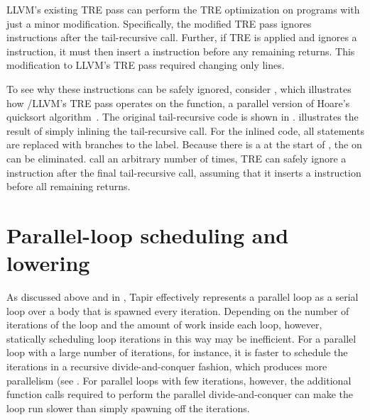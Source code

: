 LLVM's existing TRE pass can perform the TRE optimization on \tapir
programs with just a minor modification.  Specifically, the modified
TRE pass ignores \sync instructions after the tail-recursive call.
Further, if TRE is applied and ignores a \sync instruction, it must
then insert a \sync instruction before any remaining returns.  This
modification to LLVM's TRE pass required changing only
 lines.

To see why these \sync instructions can be safely ignored, consider
, which illustrates how \tapir/LLVM's TRE pass operates
on the  function, a parallel version of Hoare's quicksort
algorithm~\cite{Hoare61}.  The original tail-recursive code is shown
in .   illustrates the
result of simply inlining the tail-recursive call.  For the inlined
code, all  statements are replaced with branches to the
 label.  Because there is a \CilkSync at the start of
, the \CilkSync on  can be eliminated.
call an arbitrary number of times, TRE can safely ignore a \CilkSync
instruction after the final tail-recursive call, assuming that it
inserts a \CilkSync instruction before all remaining returns.

\section{Parallel-loop scheduling and lowering}

As discussed above and in , Tapir effectively represents
a parallel loop as a serial loop over a body that is spawned every
iteration.  Depending on the number of iterations of the loop and the
amount of work inside each loop, however, statically scheduling loop
iterations in this way may be inefficient.  For a parallel loop with a
large number of iterations, for instance, it is faster to schedule the
iterations in a recursive divide-and-conquer fashion, which produces
more parallelism (see \cite[Sec.~8.3]{McCoolRoRe12}.
For parallel loops with few iterations, however, the additional
function calls required to perform the parallel divide-and-conquer can
make the loop run slower than simply spawning off the iterations.

